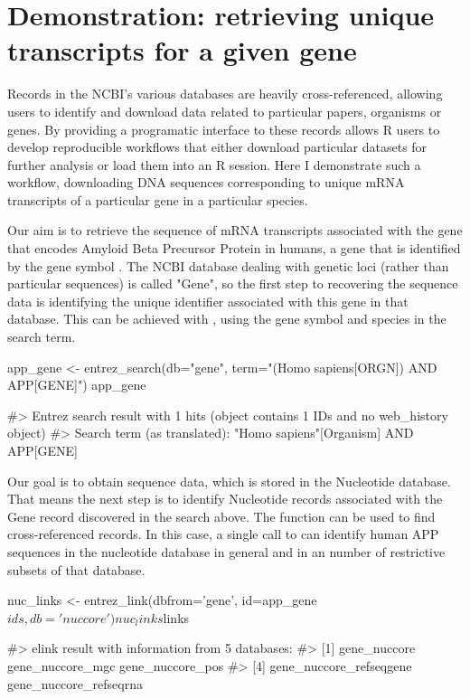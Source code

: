 \section{Demonstration: retrieving unique transcripts for a given gene}

Records in the NCBI's various databases are heavily cross-referenced, allowing
users to identify and download data related to particular papers, organisms or 
genes. By providing a programatic interface to these records 
allows R users to develop reproducible workflows that either download particular
datasets for further analysis or load them into an R session. Here I demonstrate
such a workflow, downloading DNA sequences corresponding to unique
mRNA transcripts of a particular gene in a particular species.


Our aim is to retrieve the sequence of mRNA transcripts associated with the gene 
that encodes Amyloid Beta Precursor Protein in humans, a gene that is 
identified by the gene symbol . The NCBI database dealing with genetic loci 
(rather than particular sequences) is called "Gene", so the first step to 
recovering the sequence data is identifying the unique identifier associated with 
this gene in that database. This can be achieved with , using the
gene symbol and species in the search term.


\begin{example}
app_gene <- entrez_search(db="gene", term="(Homo sapiens[ORGN]) AND APP[GENE]")
app_gene

#> Entrez search result with 1 hits (object contains 1 IDs and no web_history object)
#>  Search term (as translated):  "Homo sapiens"[Organism] AND APP[GENE]
\end{example}


Our goal is to obtain sequence data, which is stored in the Nucleotide database. 
That means the next step is to identify Nucleotide records associated with 
the Gene record discovered in the search above. The function  can be 
used to find cross-referenced records. In this case, a single call to 
 can identify human APP sequences in the nucleotide database in 
general and in an number of restrictive subsets of that database.

\begin{example}
nuc_links <- entrez_link(dbfrom='gene', id=app_gene$ids, db='nuccore')
nuc_links$links

#> elink result with information from 5 databases:
#> [1] gene_nuccore            gene_nuccore_mgc        gene_nuccore_pos       
#> [4] gene_nuccore_refseqgene gene_nuccore_refseqrna
\end{example}

